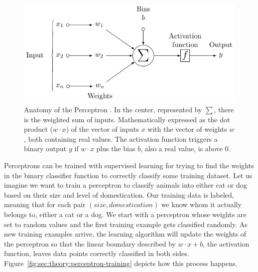 \begin{figure}[htb]
  \includegraphics[width=\textwidth]{tkz/perceptron}
  \caption{Anatomy of the Perceptron \cite{Medina2013}.
    In the center, represented by $\sum$, there is the weighted sum of inputs.
    Mathematically expressed as the dot product (${w}\cdot{x}$) of the vector of inputs $x$ with the vector of weights $w$, both containing real values.
    The activation function triggers a binary output $y$ if ${w}\cdot{x}$ plus the bias $b$, also a real value, is above $0$.}
  \label{fig:sec:theory:perceptron}
\end{figure}

Perceptrons can be trained with supervised learning for trying to find the weights in the binary classifier function to correctly classify some training dataset.
Let us imagine we want to train a perceptron to classify animals into either cat or dog based on their size and level of domestication.
Our training data is labeled, meaning that for each pair $(size, domestication)$ we know whom it actually belongs to, either a cat or a dog.
We start with a perceptron whose weights are set to random values and the first training example gets classified randomly.
As new training examples arrive, the learning algorithm will update the weights of the perceptron so that the linear boundary described by ${w}\cdot{x}+b$, the activation function, leaves data points correctly classified in both sides.
Figure~\ref{fig:sec:theory:perceptron-training} depicts how this process happens.

